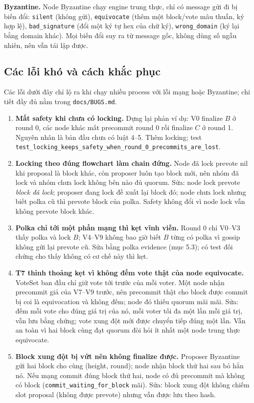\documentclass[11pt,a4paper]{article}
\newcommand{\code}[1]{\texttt{#1}}
\begin{document}
\textbf{Byzantine.} Node Byzantine chạy engine trung thực, chỉ có message gửi đi bị biến đổi: \code{silent} (không gửi), \code{equivocate} (thêm một block/vote mâu thuẫn, ký hợp lệ), \code{bad\_signature} (đổi một ký tự hex của chữ ký), \code{wrong\_domain} (ký lại bằng domain khác). Mọi biến đổi suy ra từ message gốc, không dùng số ngẫu nhiên, nên vẫn tái lập được.

\subsection{Các lỗi khó và cách khắc phục}
Các lỗi dưới đây chỉ lộ ra khi chạy nhiều process với lỗi mạng hoặc Byzantine; chi tiết đầy đủ nằm trong \code{docs/BUGS.md}.
\begin{enumerate}[leftmargin=1.5em]
\item \textbf{Mất safety khi chưa có locking.} Dựng lại phản ví dụ: V0 finalize $B$ ở round 0, các node khác mất precommit round 0 rồi finalize $C$ ở round 1. Nguyên nhân là bản đầu chưa có luật 4--5. Thêm locking; test \code{test\_locking\_keeps\_safety\_when\_round\_0\_precommits\_are\_lost}.
\item \textbf{Locking theo đúng flowchart làm chain đứng.} Node đã lock prevote nil khi proposal là block khác, còn proposer luôn tạo block mới, nên nhóm đã lock và nhóm chưa lock không bên nào đủ quorum. Sửa: node lock prevote \emph{block đã lock}; proposer đang lock đề xuất lại block đó; node chưa lock nhưng biết polka cũ thì prevote block của polka. Safety không đổi vì node lock vẫn không prevote block khác.
\item \textbf{Polka chỉ tới một phần mạng thì kẹt vĩnh viễn.} Round 0 chỉ V0--V3 thấy polka và lock $B$; V4--V9 không bao giờ biết $B$ từng có polka vì gossip không gửi lại prevote cũ. Sửa bằng polka evidence (mục 5.3); có test đối chứng cho thấy không có cơ chế này thì kẹt.
\item \textbf{T7 thỉnh thoảng kẹt vì không đếm vote thật của node equivocate.} VoteSet ban đầu chỉ giữ vote tới trước của mỗi voter. Một node nhận precommit giả của V7--V9 trước, nên precommit thật cho block được commit bị coi là equivocation và không đếm; node đó thiếu quorum mãi mãi. Sửa: đếm mỗi vote cho đúng giá trị của nó, mỗi voter tối đa một lần mỗi giá trị, vẫn lưu bằng chứng; vote xung đột mới được chuyển tiếp đúng một lần. Vẫn an toàn vì hai block cùng đạt quorum đòi hỏi ít nhất một node trung thực equivocate.
\item \textbf{Block xung đột bị vứt nên không finalize được.} Proposer Byzantine gửi hai block cho cùng (height, round); node nhận block thứ hai sau bỏ hẳn nó. Nếu mạng commit đúng block thứ hai, node có đủ precommit mà không có block (\code{commit\_waiting\_for\_block} mãi). Sửa: block xung đột không chiếm slot proposal (không được prevote) nhưng vẫn được lưu theo hash.

\end{enumerate}
\end{document}
